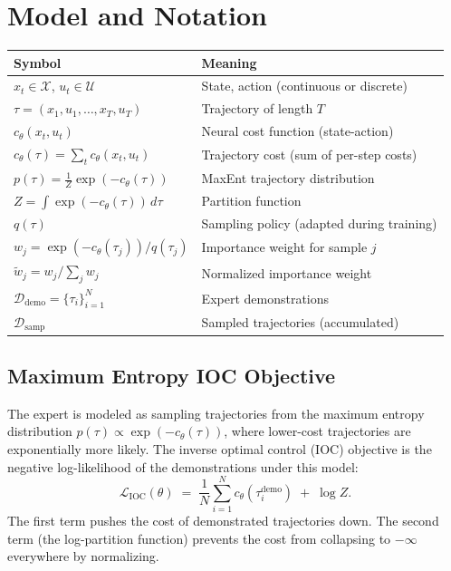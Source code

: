 \documentclass[11pt]{article}
\begin{document}
\section{Model and Notation}

\begin{table}[h!]
\centering\small
\begin{tabular}{ll}
\toprule
Symbol & Meaning \\
\midrule
$x_t \in \mathcal{X}$, $u_t \in \mathcal{U}$ & State, action (continuous or discrete) \\
$\tau = (x_1, u_1, \ldots, x_T, u_T)$ & Trajectory of length $T$ \\
$c_\theta(x_t, u_t)$ & Neural cost function (state-action) \\
$c_\theta(\tau) = \sum_t c_\theta(x_t, u_t)$ & Trajectory cost (sum of per-step costs) \\
\midrule
$p(\tau) = \frac{1}{Z}\exp(-c_\theta(\tau))$ & MaxEnt trajectory distribution \\
$Z = \int \exp(-c_\theta(\tau))\,d\tau$ & Partition function \\
$q(\tau)$ & Sampling policy (adapted during training) \\
$w_j = \exp(-c_\theta(\tau_j)) / q(\tau_j)$ & Importance weight for sample $j$ \\
$\tilde w_j = w_j / \sum_j w_j$ & Normalized importance weight \\
\midrule
$\mathcal{D}_{\text{demo}} = \{\tau_i\}_{i=1}^N$ & Expert demonstrations \\
$\mathcal{D}_{\text{samp}}$ & Sampled trajectories (accumulated) \\
\bottomrule
\end{tabular}
\end{table}
\FloatBarrier

\subsection{Maximum Entropy IOC Objective}

The expert is modeled as sampling trajectories from the maximum entropy distribution $p(\tau) \propto \exp(-c_\theta(\tau))$, where lower-cost trajectories are exponentially more likely.
The inverse optimal control (IOC) objective is the negative log-likelihood of the demonstrations under this model:
\begin{equation}
\label{eq:ioc}
\mathcal{L}_{\text{IOC}}(\theta) \;=\; \frac{1}{N}\sum_{i=1}^N c_\theta(\tau_i^{\text{demo}}) \;+\; \log Z.
\end{equation}
The first term pushes the cost of demonstrated trajectories down.
The second term (the log-partition function) prevents the cost from collapsing to $-\infty$ everywhere by normalizing.
\end{document}

